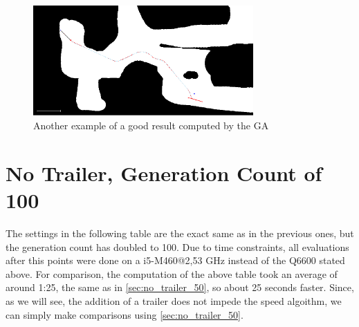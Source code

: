 \begin{figure}[b]
\centering
\includegraphics[width=0.75\textwidth]{./Chapters/Figures/example_good_path2.png}
\caption{Another example of a good result computed by the GA\label{pic:example_good_path2}}
\end{figure}


\section{No Trailer, Generation Count of 100}
\label{sec:no_trailer_100}

The settings in the following table are the exact same as in the previous ones, but the generation count has doubled to 100.
Due to time constraints, all evaluations after this points were done on a i5-M460@2,53 GHz instead of the Q6600 stated above. For comparison, the computation of the above table took an average of around 1:25, the same as in \ref{sec:no_trailer_50}, so about 25 seconds faster. Since, as we will see, the addition of a trailer does not impede the speed algoithm, we can simply make comparisons using \ref{sec:no_trailer_50}.

